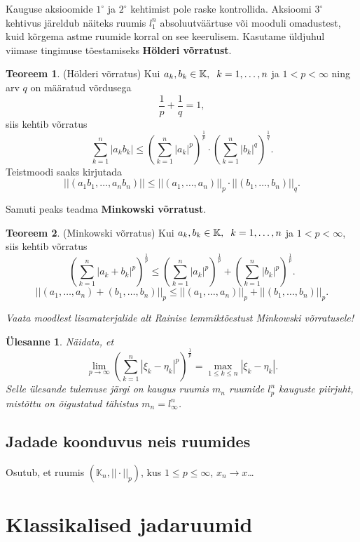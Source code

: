 \documentclass{article}[12pt]
\newcommand{\h}{\hspace{0.2cm}}
\newcommand{\K}{\mathbb{K}}
\newcommand{\norm}[1]{||#1||}
\newtheorem{yl}{Ülesanne}[section]
\theoremstyle{definition}
\theoremstyle{definition}
\newtheorem{theorem}{Teoreem}[section]
\begin{document}
\begin{enumerate}
	Kauguse aksioomide $1^\circ$ ja $2^\circ$ kehtimist pole raske kontrollida.
	Aksioomi $3^\circ$ kehtivus järeldub näiteks ruumis $l_1^n$ absoluutväärtuse või mooduli omadustest, kuid kõrgema astme ruumide korral on see keerulisem.
	Kasutame üldjuhul viimase tingimuse tõestamiseks \textbf{Hölderi võrratust}.
	\begin{theorem}
		(Hölderi võrratus) Kui $a_k,b_k\in \K,\h k=1,\dots,n$ ja $1<p<\infty$ ning arv $q$ on määratud võrdusega
		\[
			\frac{1}{p} + \frac{1}{q} = 1,
		\]
		siis kehtib võrratus
		\[
			\sum_{k=1}^n |a_k b_k| \leq \left( \sum_{k=1}^n |a_k|^p \right)^{\frac{1}{p}} \cdot \left( \sum_{k=1}^n |b_k|^q \right)^{\frac{1}{q}}.
		\]
		Teistmoodi saaks kirjutada
		\[
			\norm{(a_1b_1,\dots,a_nb_n)} \leq \norm{(a_1,\dots,a_n)}_p \cdot \norm{(b_1,\dots,b_n)}_q.
		\]
	\end{theorem}
	Samuti peaks teadma \textbf{Minkowski võrratust}.
	\begin{theorem}
		(Minkowski võrratus) Kui $a_k,b_k\in \K,\h k=1,\dots,n$ ja $1<p<\infty$, siis kehtib võrratus
		\[
			\left( \sum_{k=1}^n |a_k + b_k|^p \right)^{\frac{1}{p}} \leq \left( \sum_{k=1}^n |a_k|^p \right)^{\frac{1}{p}} + \left( \sum_{k=1}^n |b_k|^p \right)^{\frac{1}{p}}.
		\]
		\[
			\norm{(a_1,\dots,a_n) + (b_1,\dots,b_n)}_p \leq \norm{(a_1,\dots,a_n)}_p + \norm{(b_1,\dots,b_n)}_p.
		\]
	\end{theorem}

	\textit{Vaata moodlest lisamaterjalide alt Rainise lemmiktõestust Minkowski võrratusele!}

	\begin{yl}
		Näidata, et
		\[
			\lim_{p\rightarrow \infty} \left( \sum_{k=1}^n |\xi_k-\eta_k|^p \right)^{\frac{1}{p}} = \max_{1\leq k\leq n} |\xi_k - \eta_k|.
		\]
		Selle ülesande tulemuse järgi on kaugus ruumis $m_n$ ruumide $l_p^n$ kauguste piirjuht, mistõttu on õigustatud tähistus $m_n = l_\infty^n$.
	\end{yl}

\end{enumerate}

\subsection*{Jadade koonduvus neis ruumides}

Osutub, et ruumis $(\K_n, \norm{\cdot}_p)$, kus $1\leq p\leq \infty$, $x_n\rightarrow x$\dots

\section{Klassikalised jadaruumid}
\end{document}
